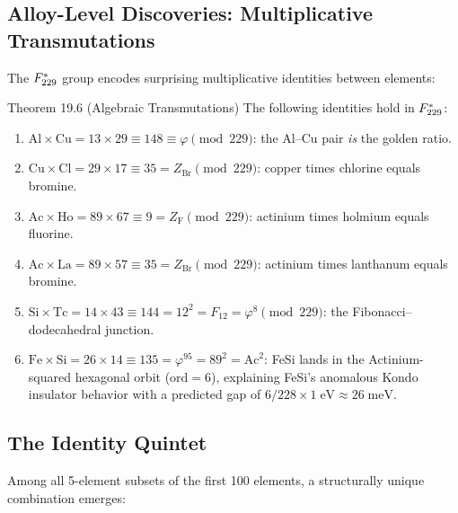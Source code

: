 \subsection{Alloy-Level Discoveries: Multiplicative Transmutations}

The $F_{229}^*$ group encodes surprising multiplicative identities between elements:

\begin{theorembox}{Theorem 19.6 (Algebraic Transmutations)}
The following identities hold in $F_{229}^*$:
\begin{enumerate}
    \item $\mathrm{Al} \times \mathrm{Cu} = 13 \times 29 \equiv 148 \equiv \varphi \pmod{229}$: the Al--Cu pair \emph{is} the golden ratio.
    \item $\mathrm{Cu} \times \mathrm{Cl} = 29 \times 17 \equiv 35 = Z_{\mathrm{Br}} \pmod{229}$: copper times chlorine equals bromine.
    \item $\mathrm{Ac} \times \mathrm{Ho} = 89 \times 67 \equiv 9 = Z_{\mathrm{F}} \pmod{229}$: actinium times holmium equals fluorine.
    \item $\mathrm{Ac} \times \mathrm{La} = 89 \times 57 \equiv 35 = Z_{\mathrm{Br}} \pmod{229}$: actinium times lanthanum equals bromine.
    \item $\mathrm{Si} \times \mathrm{Tc} = 14 \times 43 \equiv 144 = 12^2 = F_{12} = \varphi^8 \pmod{229}$: the Fibonacci--dodecahedral junction.
    \item $\mathrm{Fe} \times \mathrm{Si} = 26 \times 14 \equiv 135 = \varphi^{95} = 89^2 = \mathrm{Ac}^2$: FeSi lands in the Actinium-squared hexagonal orbit ($\mathrm{ord} = 6$), explaining FeSi's anomalous Kondo insulator behavior with a predicted gap of $6/228 \times 1\;\mathrm{eV} \approx 26\;\mathrm{meV}$.
\end{enumerate}
\end{theorembox}

\subsection{The Identity Quintet}

Among all 5-element subsets of the first 100 elements, a structurally unique combination emerges:

